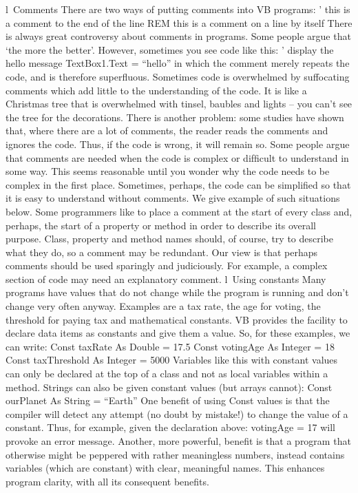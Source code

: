 l Comments
There are two ways of putting comments into VB programs:
’ this is a comment to the end of the line
REM this is a comment on a line by itself
 There is always great controversy about comments in programs. Some people argue that ‘the more the better’. However, sometimes you see code like this:
’ display the hello message
TextBox1.Text = “hello”
in which the comment merely repeats the code, and is therefore superﬂuous.
Sometimes code is overwhelmed by suffocating comments which add little to the understanding of the code. It is like a Christmas tree that is overwhelmed with tinsel, baubles and lights – you can’t see the tree for the decorations. There is another problem: some studies have shown that, where there are a lot of comments, the reader reads the comments and ignores the code. Thus, if the code is wrong, it will remain so.
Some people argue that comments are needed when the code is complex or difﬁcult to understand in some way. This seems reasonable until you wonder why the code needs to be complex in the ﬁrst place. Sometimes, perhaps, the code can be simpliﬁed so that it is easy to understand without comments. We give example of such situations below.
Some programmers like to place a comment at the start of every class and, perhaps, the start of a property or method in order to describe its overall purpose. Class, property and method names should, of course, try to describe what they do, so a comment may be redundant.
Our view is that perhaps comments should be used sparingly and judiciously. For example, a complex section of code may need an explanatory comment.
l Using constants
Many programs have values that do not change while the program is running and don’t change very often anyway. Examples are a tax rate, the age for voting, the threshold for paying tax and mathematical constants. VB provides the facility to declare data items as constants and give them a value. So, for these examples, we can write:
Const taxRate As Double = 17.5
Const votingAge As Integer = 18
Const taxThreshold As Integer = 5000
Variables like this with constant values can only be declared at the top of a class and not as local variables within a method.
Strings can also be given constant values (but arrays cannot):
Const ourPlanet As String = “Earth”
One beneﬁt of using Const values is that the compiler will detect any attempt (no doubt by mistake!) to change the value of a constant. Thus, for example, given the declaration above:
votingAge = 17
will provoke an error message.
Another, more powerful, beneﬁt is that a program that otherwise might be peppered with rather meaningless numbers, instead contains variables (which are constant) with clear, meaningful names. This enhances program clarity, with all its consequent beneﬁts.
